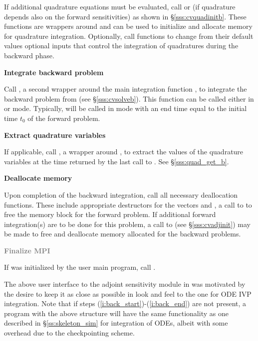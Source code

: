 \begin{Steps}
  If additional quadrature equations must be evaluated, 
  call  or  (if quadrature depends also on the
  forward sensitivities) as shown in \S\ref{sss:cvquadinitb}. These functions are
  wrappers around  and can be used to initialize and allocate 
  memory for quadrature integration. Optionally, call  functions 
  to change from their default values optional inputs that control the integration 
  of quadratures during the backward phase.

\item
  {\bf Integrate backward problem}

  Call , a second wrapper around the {\cvodes} main integration
  function , to integrate the backward problem from 
  (see \S\ref{sss:cvsolveb}). This function can be called either in 
  or  mode. Typically,  will be called in 
  mode with an end time equal to the initial time $t_0$ of the forward problem.

\item \label{i:back_end}
  {\bf Extract quadrature variables}

  If applicable, call , a wrapper around ,
  to extract the values of the quadrature variables at the time returned
  by the last call to . See \S\ref{sss:quad_get_b}.

\item
  {\bf Deallocate memory}

  Upon completion of the backward integration, call all necessary deallocation
  functions. These include appropriate destructors for the vectors 
   and , a call to  to free the {\cvodes} memory block 
  for the forward problem.  If additional forward integration(s) are to be done
  for this problem, a call to  (see \S\ref{sss:cvadjinit}) may be
  made to free and deallocate memory allocated for the backward problems. 

\item
  \textcolor{gray}{\bf Finalize MPI}

  {\p} If {\mpi} was initialized by the user main program, call .

\end{Steps}

The above user interface to the adjoint sensitivity module in {\cvodes} was motivated by
the desire to keep it as close as possible in look and feel to the one for ODE IVP 
integration. Note that if steps (\ref{i:back_start})-(\ref{i:back_end}) are not present, 
a program with the above structure will have the same functionality as one described in
\S\ref{ss:skeleton_sim} for integration of ODEs, albeit with some overhead due to 
the checkpointing scheme.

